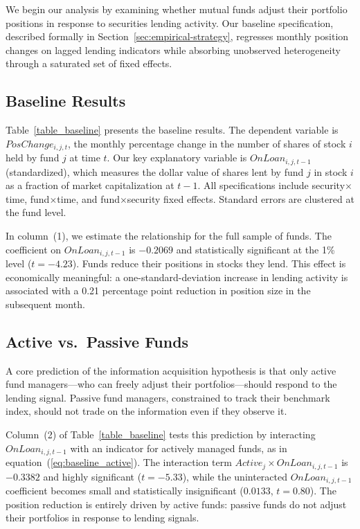 
We begin our analysis by examining whether mutual funds adjust their portfolio positions in response to securities lending activity. Our baseline specification, described formally in Section~\ref{sec:empirical-strategy}, regresses monthly position changes on lagged lending indicators while absorbing unobserved heterogeneity through a saturated set of fixed effects.

\subsection{Baseline Results}

Table~\ref{table_baseline} presents the baseline results. The dependent variable is $PosChange_{i,j,t}$, the monthly percentage change in the number of shares of stock $i$ held by fund $j$ at time $t$. Our key explanatory variable is $OnLoan_{i,j,t-1}$ (standardized), which measures the dollar value of shares lent by fund $j$ in stock $i$ as a fraction of market capitalization at $t-1$. All specifications include security$\times$time, fund$\times$time, and fund$\times$security fixed effects. Standard errors are clustered at the fund level.

In column~(1), we estimate the relationship for the full sample of funds. The coefficient on $OnLoan_{i,j,t-1}$ is $-0.2069$ and statistically significant at the 1\% level ($t = -4.23$). Funds reduce their positions in stocks they lend. This effect is economically meaningful: a one-standard-deviation increase in lending activity is associated with a 0.21 percentage point reduction in position size in the subsequent month.

\subsection{Active vs.\ Passive Funds}

A core prediction of the information acquisition hypothesis is that only active fund managers---who can freely adjust their portfolios---should respond to the lending signal. Passive fund managers, constrained to track their benchmark index, should not trade on the information even if they observe it.

Column~(2) of Table~\ref{table_baseline} tests this prediction by interacting $OnLoan_{i,j,t-1}$ with an indicator for actively managed funds, as in equation~(\ref{eq:baseline_active}). The interaction term $Active_j \times OnLoan_{i,j,t-1}$ is $-0.3382$ and highly significant ($t = -5.33$), while the uninteracted $OnLoan_{i,j,t-1}$ coefficient becomes small and statistically insignificant ($0.0133$, $t = 0.80$). The position reduction is entirely driven by active funds: passive funds do not adjust their portfolios in response to lending signals.

